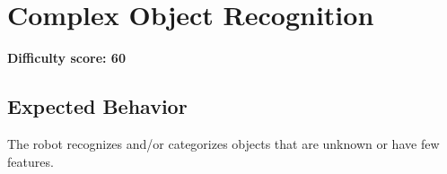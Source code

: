 \section{Complex Object Recognition}

\textbf{Difficulty score: 60}

\subsection{Expected Behavior}
The robot recognizes and/or categorizes objects that are unknown or have few features.


